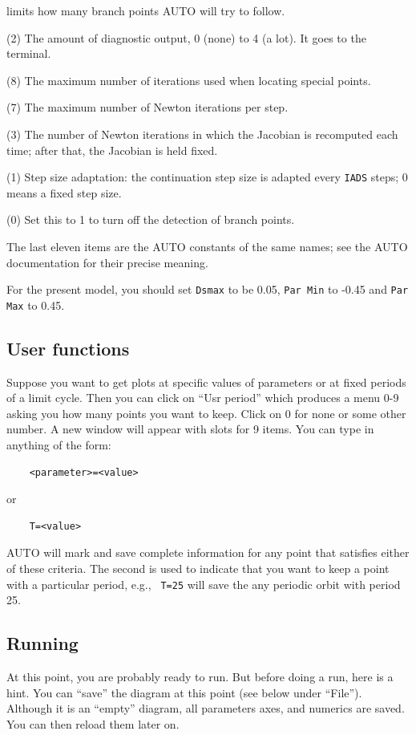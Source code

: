 \documentclass{article}
\begin{document}
\begin{description}
limits how many branch points AUTO will try to follow.
\item[IID] (2) The amount of diagnostic output, 0 (none) to 4 (a lot).  It
goes to the terminal.
\item[ITMX] (8) The maximum number of iterations used when locating special points.
\item[ITNW] (7) The maximum number of Newton iterations per step.
\item[NWTN] (3) The number of Newton iterations in which the Jacobian is
recomputed each time; after that, the Jacobian is held fixed.
\item[IADS] (1) Step size adaptation: the continuation step size is adapted every {\tt IADS} steps;
0 means a fixed step size.
\item[SuppBP] (0) Set this to 1 to turn off the detection of branch points.
\end{description}

The last eleven items are the AUTO constants of the same names; see
the AUTO documentation for their precise meaning.

For the present model, you should set {\tt Dsmax} to be 0.05, {\tt Par
Min} to -0.45 and {\tt Par Max} to 0.45.

\subsection{User functions}

Suppose you want to get plots at specific values of parameters or at
fixed periods of a limit cycle.  Then you can click on ``Usr period''
which produces a menu 0-9 asking you how many points you want to keep.
Click on 0 for none or some other number.  A new window will appear
with slots for 9 items.  You can type in anything of the form:
\begin{verbatim}
	<parameter>=<value>
\end{verbatim}
or
\begin{verbatim}
	T=<value>
\end{verbatim}
AUTO will mark and save complete information for any point that
satisfies either of these criteria.  The second is used to indicate
that you want to keep a point with a particular period, e.g., {\tt
T=25} will save the any periodic orbit with period 25.

\subsection{Running}
At this point, you are probably ready to run.  But before doing a run,
here is a hint.  You can ``save'' the diagram at this point (see below
under ``File'').  Although it is an ``empty'' diagram, all parameters
axes, and numerics are saved.  You can then reload them later on.
\end{document}
